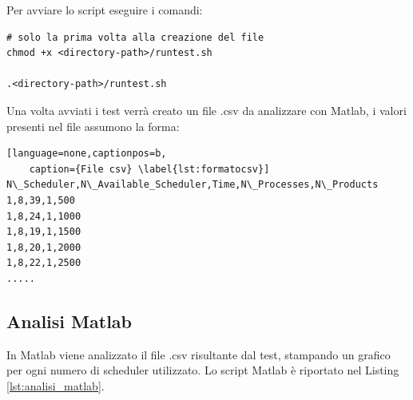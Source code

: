 Per avviare lo script eseguire i comandi:
\begin{lstlisting}[language=none]
# solo la prima volta alla creazione del file
chmod +x <directory-path>/runtest.sh 

.<directory-path>/runtest.sh
\end{lstlisting}

Una volta avviati i test verrà creato un file .csv da
analizzare con Matlab, i valori presenti nel file
assumono la forma:

\begin{lstlisting}[language=none,captionpos=b,
	caption={File csv} \label{lst:formatocsv}]
N\_Scheduler,N\_Available_Scheduler,Time,N\_Processes,N\_Products
1,8,39,1,500
1,8,24,1,1000
1,8,19,1,1500
1,8,20,1,2000
1,8,22,1,2500
.....
\end{lstlisting}


\subsection{Analisi Matlab}

In Matlab viene analizzato il file .csv risultante dal
test, stampando un grafico per ogni numero di scheduler utilizzato.
Lo script Matlab è riportato nel Listing \ref{lst:analisi_matlab}.

